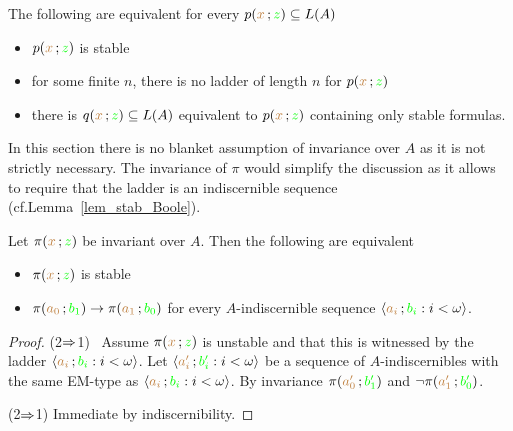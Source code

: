 \begin{fact}\label{}
  The following are equivalent for every $p({\color{brown} x}\,;{\color{green} z})\subseteq L(A)$
  \begin{itemize}
    \item [1.] $p({\color{brown} x}\,;{\color{green} z})$ is stable
    \item [1.] for some finite $n$, there is no ladder of length $n$ for $p({\color{brown} x}\,;{\color{green} z})$
    \item [2.] there is $q({\color{brown} x}\,;{\color{green} z})\subseteq L(A)$ equivalent to $p({\color{brown} x}\,;{\color{green} z})$ containing only stable formulas.
  \end{itemize}
\end{fact}

In this section there is no blanket assumption of invariance over $A$ as it is not strictly necessary.
The invariance of $\pi$ would simplify the discussion as it allows to require that the ladder is an indiscernible sequence (cf.\@ Lemma~\ref{lem_stab_Boole}). 

\begin{theorem}\label{thm_sability_indiscernibility}
  Let $\pi({\color{brown} x}\,;{\color{green} z})$ be invariant over $A$.
  Then the following are equivalent
  \begin{itemize}
    \item[1.] $\pi({\color{brown} x}\,;{\color{green} z})$ is stable
    \item[2.] $\pi({\color{brown} a_0}\,;{\color{green} b_1})\rightarrow\pi({\color{brown} a_1}\,;{\color{green} b_0})$ for every $A$-indiscernible sequence $\langle{\color{brown}a_i}\,;{\color{green} b_i} : i<\omega\rangle$.
  \end{itemize}
\end{theorem}

\begin{proof}
  (2$\Rightarrow$1) \ Assume $\pi({\color{brown} x}\,;{\color{green} z})$ is unstable and that this is witnessed by the ladder $\langle{\color{brown}a_i}\,;{\color{green} b_i} : i<\omega\rangle$.
  Let $\langle{\color{brown}a'_i}\,;{\color{green} b'_i} : i<\omega\rangle$ be a sequence of $A$-indiscernibles with the same EM-type as $\langle{\color{brown}a_i}\,;{\color{green} b_i} : i<\omega\rangle$.
  By invariance $\pi({\color{brown} a'_0}\,;{\color{green} b'_1})$ and $\neg\pi({\color{brown} a'_1}\,;{\color{green} b'_0})$.

  (2$\Rightarrow$1) Immediate by indiscernibility.
\end{proof}


